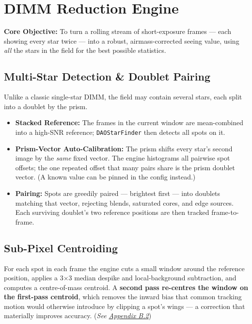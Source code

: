 \documentclass[11pt,a4paper]{article}
\begin{document}
\section{DIMM Reduction Engine}
\textbf{Core Objective:} To turn a rolling stream of short-exposure frames --- each showing every star twice --- into a robust, airmass-corrected seeing value, using \emph{all} the stars in the field for the best possible statistics.

\subsection{Multi-Star Detection \& Doublet Pairing}
Unlike a classic single-star DIMM, the field may contain several stars, each split into a doublet by the prism.
\begin{itemize}[leftmargin=*]
    \item \textbf{Stacked Reference:} The frames in the current window are mean-combined into a high-SNR reference; \texttt{DAOStarFinder} then detects all spots on it.
    \item \textbf{Prism-Vector Auto-Calibration:} The prism shifts every star's second image by the \emph{same} fixed vector. The engine histograms all pairwise spot offsets; the one repeated offset that many pairs share is the prism doublet vector. (A known value can be pinned in the config instead.)
    \item \textbf{Pairing:} Spots are greedily paired --- brightest first --- into doublets matching that vector, rejecting blends, saturated cores, and edge sources. Each surviving doublet's two reference positions are then tracked frame-to-frame.
\end{itemize}

\subsection{Sub-Pixel Centroiding}
For each spot in each frame the engine cuts a small window around the reference position, applies a 3$\times$3 median despike and local-background subtraction, and computes a centre-of-mass centroid. A \textbf{second pass re-centres the window on the first-pass centroid}, which removes the inward bias that common tracking motion would otherwise introduce by clipping a spot's wings --- a correction that materially improves accuracy. (\textit{See \hyperref[app:twopass]{Appendix B.2}})
\end{document}
